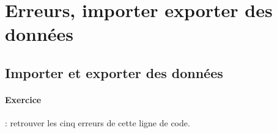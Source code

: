\section{Erreurs, importer exporter des données}
\subsection{Importer et exporter des données}

\paragraph{Exercice} : retrouver les cinq erreurs de cette ligne de code.

